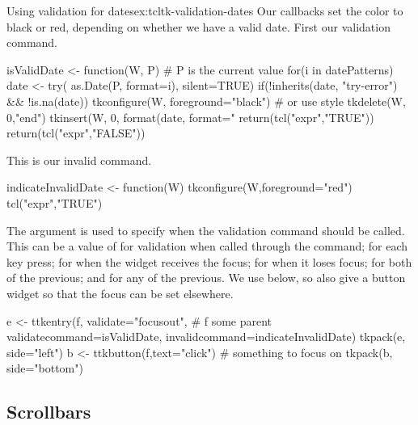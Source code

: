 \begin{example}{Using validation for dates}{ex:tcltk-validation-dates}
Our callbacks set the color to black or red, depending on whether we
have a valid date. First our validation command.
\begin{Schunk}
\begin{Sinput}
 isValidDate <- function(W, P) { # P is the current value
   for(i in datePatterns) {
     date <- try( as.Date(P, format=i), silent=TRUE)
     if(!inherits(date, "try-error") && !is.na(date)) {
       tkconfigure(W, foreground="black")  # or use style
       tkdelete(W, 0,"end")
       tkinsert(W, 0, format(date, format="%
       return(tcl("expr","TRUE"))        
     } 
   }
   return(tcl("expr","FALSE"))
 }
\end{Sinput}
\end{Schunk}

This is our invalid command.
\begin{Schunk}
\begin{Sinput}
 indicateInvalidDate <- function(W) {
   tkconfigure(W,foreground="red")
   tcl("expr","TRUE")
 }
\end{Sinput}
\end{Schunk}


The  argument is used to specify when the
validation command should be called. This can be a value of
 for validation when called through the 
command;  for each key press;  for when the
widget receives the focus;  for when it loses focus;
 for both of the previous; and  for any of the
previous. We use  below, so also give a button widget
so that the focus can be set elsewhere. 
\begin{Schunk}
\begin{Sinput}
 e <- ttkentry(f, validate="focusout",   # f some parent
               validatecommand=isValidDate,
               invalidcommand=indicateInvalidDate)
 tkpack(e, side="left")
 b <- ttkbutton(f,text="click")       # something to focus on
 tkpack(b, side="bottom")
\end{Sinput}
\end{Schunk}
              
\end{example}


\subsection{Scrollbars}
\label{sec:tcltk:scrollbars}


